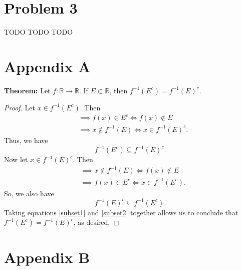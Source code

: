 \documentclass{article}
\begin{document}
\section*{Problem 3}
TODO TODO TODO

\begin{appendices}
	
\section{Appendix A}
\label{appendix:A}
\textbf{Theorem:} Let $f:\mathbb{R}\rightarrow\mathbb{R}$. If $E \subset \mathbb{R}$, then $f^{-1}(E^c) = f^{-1}(E)^c$.
\begin{proof}
	Let $x \in f^{-1}(E^c)$. Then
	\begin{align}
		&\implies f(x) \in E^c \iff f(x) \notin E \\
		&\implies x \notin f^{-1}(E) \iff x \in f^{-1}(E)^c.
	\end{align}
	Thus, we have
	\begin{equation}\label{subset1}
		f^{-1}(E^c) \subseteq f^{-1}(E)^c.
	\end{equation}
	Now let $x\in f^{-1}(E)^c$. Then
	\begin{align}
		&\implies x \notin f^{-1}(E) \iff f(x) \notin E \\
		&\implies f(x) \in E^c \iff x \in f^{-1}(E^c).
	\end{align}
	So, we also have
	\begin{equation}\label{subset2}
		f^{-1}(E)^c \subseteq f^{-1}(E^c).
	\end{equation}
	Taking equations \eqref{subset1} and \eqref{subset2} together allows us to conclude that \\$f^{-1}(E^c) = f^{-1}(E)^c$, as desired.
\end{proof}
\section{Appendix B}
\label{appendix:B}


\end{appendices}
\end{document}
